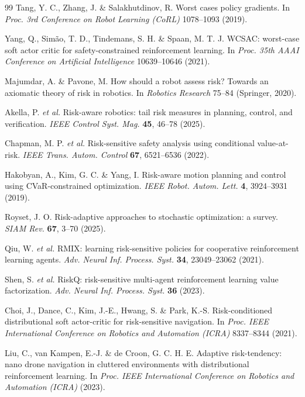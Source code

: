 \begin{thebibliography}{99}
 Tang, Y. C., Zhang, J. \& Salakhutdinov, R. Worst cases policy gradients. In \textit{Proc. 3rd Conference on Robot Learning (CoRL)} 1078--1093 (2019).

 Yang, Q., Sim\~ao, T. D., Tindemans, S. H. \& Spaan, M. T. J. WCSAC: worst-case soft actor critic for safety-constrained reinforcement learning. In \textit{Proc. 35th AAAI Conference on Artificial Intelligence} 10639--10646 (2021).

 Majumdar, A. \& Pavone, M. How should a robot assess risk? Towards an axiomatic theory of risk in robotics. In \textit{Robotics Research} 75--84 (Springer, 2020).

 Akella, P. \textit{et al.} Risk-aware robotics: tail risk measures in planning, control, and verification. \textit{IEEE Control Syst. Mag.} \textbf{45}, 46--78 (2025).

 Chapman, M. P. \textit{et al.} Risk-sensitive safety analysis using conditional value-at-risk. \textit{IEEE Trans. Autom. Control} \textbf{67}, 6521--6536 (2022).

 Hakobyan, A., Kim, G. C. \& Yang, I. Risk-aware motion planning and control using CVaR-constrained optimization. \textit{IEEE Robot. Autom. Lett.} \textbf{4}, 3924--3931 (2019).

 Royset, J. O. Risk-adaptive approaches to stochastic optimization: a survey. \textit{SIAM Rev.} \textbf{67}, 3--70 (2025).

 Qiu, W. \textit{et al.} RMIX: learning risk-sensitive policies for cooperative reinforcement learning agents. \textit{Adv. Neural Inf. Process. Syst.} \textbf{34}, 23049--23062 (2021).

 Shen, S. \textit{et al.} RiskQ: risk-sensitive multi-agent reinforcement learning value factorization. \textit{Adv. Neural Inf. Process. Syst.} \textbf{36} (2023).

 Choi, J., Dance, C., Kim, J.-E., Hwang, S. \& Park, K.-S. Risk-conditioned distributional soft actor-critic for risk-sensitive navigation. In \textit{Proc. IEEE International Conference on Robotics and Automation (ICRA)} 8337--8344 (2021).

 Liu, C., van Kampen, E.-J. \& de Croon, G. C. H. E. Adaptive risk-tendency: nano drone navigation in cluttered environments with distributional reinforcement learning. In \textit{Proc. IEEE International Conference on Robotics and Automation (ICRA)} (2023).


\end{thebibliography}
